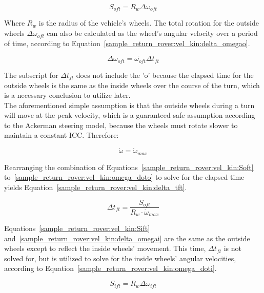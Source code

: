 \begin{equation}\label{sample_return_rover:vel_kin:Soft}
	S_{oft} = R_{w}\Delta\omega_{oft}
\end{equation}

Where $R_{w}$ is the radius of the vehicle's wheels. The total rotation for the outside wheels $\Delta\omega_{oft}$ can also be calculated as the wheel's angular velocity over a period of time, according to Equation~\ref{sample_return_rover:vel_kin:delta_omegao}.

\begin{equation}\label{sample_return_rover:vel_kin:delta_omegao}
	\Delta\omega_{oft} = \dot{\omega_{oft}}\Delta t_{ft}
\end{equation}

The subscript for $\Delta t_{ft}$ does not include the 'o' because the elapsed time for the outside wheels is the same as the inside wheels over the course of the turn, which is a necessary conclusion to utilize later. \\

The aforementioned simple assumption is that the outside wheels during a turn will move at the peak velocity, which is a guaranteed safe assumption according to the Ackerman steering model, because the wheels must rotate slower to maintain a constant \ac{ICC}. Therefore:

\begin{equation}\label{sample_return_rover:vel_kin:omega_doto}
	\dot{\omega} = \dot{\omega}_{max}
\end{equation}

Rearranging the combination of Equations~\ref{sample_return_rover:vel_kin:Soft} to~\ref{sample_return_rover:vel_kin:omega_doto} to solve for the elapsed time yields Equation~\ref{sample_return_rover:vel_kin:delta_tft}.

\begin{equation}\label{sample_return_rover:vel_kin:delta_tft}
	\Delta t_{ft} = \frac{S_{oft}}{R_{w} \cdot \dot{\omega}_{max}}
\end{equation}

Equations~\ref{sample_return_rover:vel_kin:Sift} and~\ref{sample_return_rover:vel_kin:delta_omegai} are the same as the outside wheels except to reflect the inside wheels' movement. This time, $\Delta t_{ft}$ is not solved for, but is utilized to solve for the inside wheels' angular velocities, according to Equation~\ref{sample_return_rover:vel_kin:omega_doti}.

\begin{equation}\label{sample_return_rover:vel_kin:Sift}
	S_{ift} = R_{w}\Delta\omega_{ift}
\end{equation}

